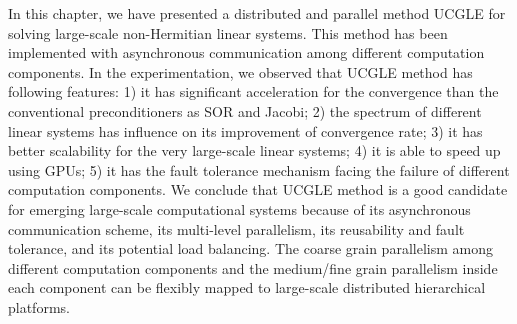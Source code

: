 In this chapter, we have presented a distributed and parallel method UCGLE for solving large-scale non-Hermitian linear systems. This method has been implemented with asynchronous communication among different computation components. In the experimentation, we observed that UCGLE method has following features: 1) it has significant acceleration for the convergence than the conventional preconditioners as SOR and Jacobi; 2) the spectrum of different linear systems has influence on its improvement of convergence rate; 3) it has better scalability for the very large-scale linear systems; 4) it is able to speed up using GPUs; 5) it has the fault tolerance mechanism facing the failure of different computation components. We conclude that UCGLE method is a good candidate for emerging large-scale computational systems because of its asynchronous communication scheme, its multi-level parallelism, its reusability and fault tolerance, and its potential load balancing. The coarse grain parallelism among different computation components and the medium/fine grain parallelism inside each component can be flexibly mapped to large-scale distributed hierarchical platforms.

\clearemptydoublepage